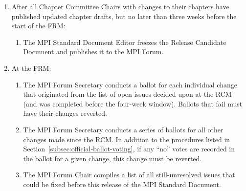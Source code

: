 {{\begin{enumerate}
\item After all Chapter Committee Chairs with changes to their
  chapters have published updated chapter drafts, but no later than
  three weeks before the start of the FRM:
  \begin{enumerate}
  \item The MPI Standard Document Editor freezes the Release Candidate
    Document and publishes it to the MPI Forum.
  \end{enumerate}

\item At the FRM:
  \begin{enumerate}
  \item The MPI Forum Secretary conducts a ballot for each individual
    change that originated from the list of open issues decided upon
    at the RCM (and was completed before the four-week window).
    Ballots that fail must have their changes reverted.
  \item The MPI Forum Secretary conducts a series of ballots for all
    other changes made since the RCM.  In addition to the procedures
    listed in Section~\ref{subsec:official-ballot-voting}, if any
    ``no'' votes are recorded in the ballot for a given change, this
    change must be reverted.
  \item The MPI Forum Chair compiles a list of all still-unresolved
    issues that could be fixed before this release of the MPI
    Standard Document.


\end{enumerate}
\end{enumerate}}}
